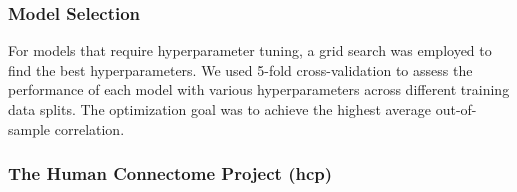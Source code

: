 \begin{table}[h]
    \centering
    \caption{Employed CCA Variants}
    \label{tab:cca-variants}
\end{table}

\subsubsection{Model Selection}

For models that require hyperparameter tuning, a grid search was employed to find the best hyperparameters. 
We used 5-fold cross-validation to assess the performance of each model with various hyperparameters across different training data splits. 
The optimization goal was to achieve the highest average out-of-sample correlation.

\subsubsection{The Human Connectome Project (\acrshort{hcp})}

